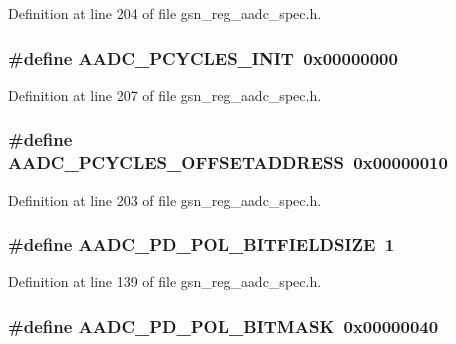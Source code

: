 Definition at line 204 of file gsn\_\-reg\_\-aadc\_\-spec.h.

\hypertarget{a00543_a7ad9a514311c815631b502864aa24075}{
\subsubsection[{AADC\_\-PCYCLES\_\-INIT}]{\setlength{\rightskip}{0pt plus 5cm}\#define AADC\_\-PCYCLES\_\-INIT~0x00000000}}
\label{a00543_a7ad9a514311c815631b502864aa24075}


Definition at line 207 of file gsn\_\-reg\_\-aadc\_\-spec.h.

\hypertarget{a00543_ae0d6153bc40f18e823ffa5d08514d49b}{
\subsubsection[{AADC\_\-PCYCLES\_\-OFFSETADDRESS}]{\setlength{\rightskip}{0pt plus 5cm}\#define AADC\_\-PCYCLES\_\-OFFSETADDRESS~0x00000010}}
\label{a00543_ae0d6153bc40f18e823ffa5d08514d49b}


Definition at line 203 of file gsn\_\-reg\_\-aadc\_\-spec.h.

\hypertarget{a00543_ae0782ebc66ecf46f58b889779ded7d77}{
\subsubsection[{AADC\_\-PD\_\-POL\_\-BITFIELDSIZE}]{\setlength{\rightskip}{0pt plus 5cm}\#define AADC\_\-PD\_\-POL\_\-BITFIELDSIZE~1}}
\label{a00543_ae0782ebc66ecf46f58b889779ded7d77}


Definition at line 139 of file gsn\_\-reg\_\-aadc\_\-spec.h.

\hypertarget{a00543_a945161d6817da5d280ae869c504d59af}{
\subsubsection[{AADC\_\-PD\_\-POL\_\-BITMASK}]{\setlength{\rightskip}{0pt plus 5cm}\#define AADC\_\-PD\_\-POL\_\-BITMASK~0x00000040}}
\label{a00543_a945161d6817da5d280ae869c504d59af}


